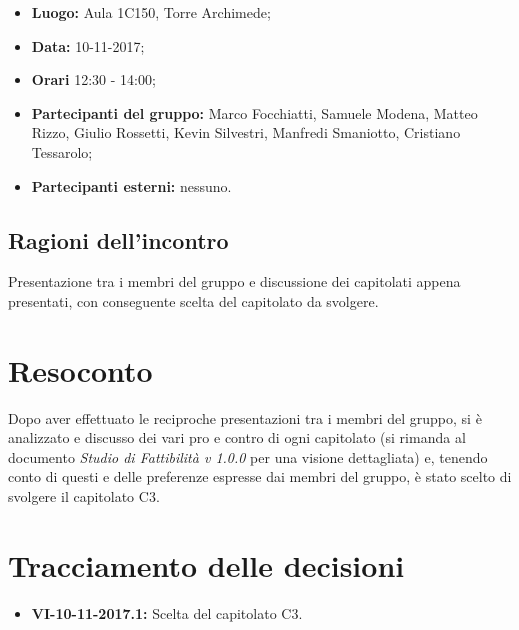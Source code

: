 \documentclass[openany,12pt,a4paper]{article}
\begin{document}
	\begin{itemize} 
	    \item \textbf{Luogo:} Aula 1C150, Torre Archimede;
	    \item \textbf{Data:} 10-11-2017;
	    \item \textbf{Orari} 12:30 - 14:00;
	    \item \textbf{Partecipanti del gruppo:} Marco Focchiatti, Samuele Modena, Matteo Rizzo, Giulio Rossetti, Kevin Silvestri, Manfredi Smaniotto, Cristiano Tessarolo;
	    \item \textbf{Partecipanti esterni:} nessuno.
	\end{itemize}
	
	\subsection{Ragioni dell'incontro}
	
	Presentazione tra i membri del gruppo e discussione dei capitolati appena presentati, con conseguente scelta del capitolato da svolgere.
	
	\section{Resoconto}
	
	Dopo aver effettuato le reciproche presentazioni tra i membri del gruppo, si è analizzato e discusso dei vari pro e contro di ogni capitolato (si rimanda al documento \textit{Studio di Fattibilità v 1.0.0} per una visione dettagliata) e, tenendo conto di questi e delle preferenze espresse dai membri del gruppo, è stato scelto di svolgere il capitolato C3.
	
	\section{Tracciamento delle decisioni}
	
	\begin{itemize}
	    \item \textbf{VI-10-11-2017.1:} Scelta del capitolato C3.
	\end{itemize}
	
	
\end{document}
